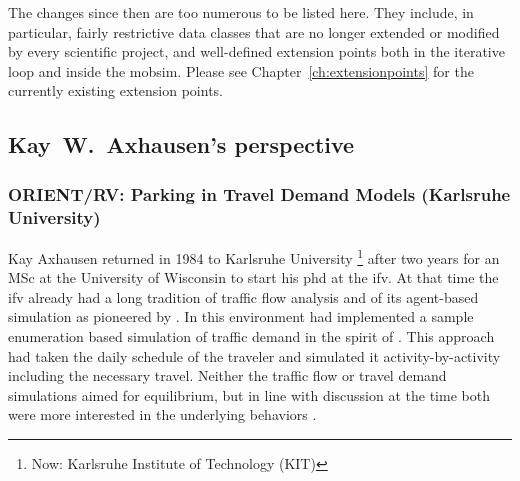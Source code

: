 The changes since then are too numerous to be listed here.  They include, in particular, fairly restrictive data classes that are no longer extended or modified by every scientific project, and well-defined extension points both in the iterative loop and inside the \gls{mobsim}.  Please see Chapter~\ref{ch:extensionpoints} for the currently existing extension points.


\subsection{Kay~W.~Axhausen's perspective}
\subsubsection{ORIENT/RV: Parking in Travel Demand Models (Karlsruhe University)}
Kay Axhausen returned in 1984 to Karlsruhe University%
\footnote{
Now: Karlsruhe Institute of Technology (KIT)
}
after two years for an MSc at the University of Wisconsin to start his \acrshort{phd} at the \gls{ifv}. At that time the \gls{ifv} already had a long tradition of traffic flow analysis \citep[][]{Leutzbach1972Buch} and of its agent-based simulation as pioneered by \citet[][]{Wiedemann_PhDThesis_1974} \citep[see also][]{LeutzbachWiedemann_TEC_1986}. In this environment \citet[][]{Sparmann_TechRep_1980} had implemented a sample enumeration based simulation of traffic demand in the spirit of \citet[][]{PoeckZumkeller_PTRC_1978}. This approach had taken the daily schedule of the traveler and simulated it activity-by-activity including the necessary travel. Neither the traffic flow or travel demand simulations aimed for equilibrium, but in line with discussion at the time both were more interested in the underlying behaviors \citep[e.g.,][]{JonesEtAl_1983}.

